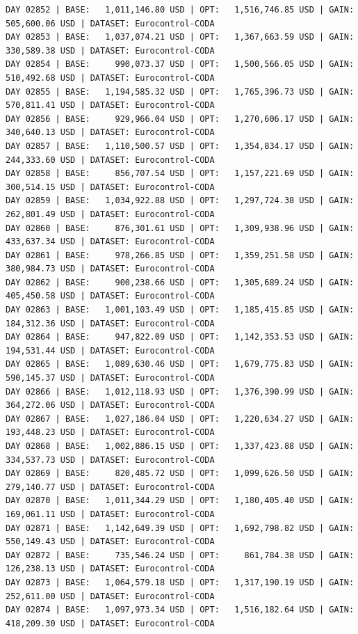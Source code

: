 \documentclass[11pt,a4paper]{article}
\begin{document}
\begin{verbatim}
DAY 02852 | BASE:   1,011,146.80 USD | OPT:   1,516,746.85 USD | GAIN: 505,600.06 USD | DATASET: Eurocontrol-CODA
DAY 02853 | BASE:   1,037,074.21 USD | OPT:   1,367,663.59 USD | GAIN: 330,589.38 USD | DATASET: Eurocontrol-CODA
DAY 02854 | BASE:     990,073.37 USD | OPT:   1,500,566.05 USD | GAIN: 510,492.68 USD | DATASET: Eurocontrol-CODA
DAY 02855 | BASE:   1,194,585.32 USD | OPT:   1,765,396.73 USD | GAIN: 570,811.41 USD | DATASET: Eurocontrol-CODA
DAY 02856 | BASE:     929,966.04 USD | OPT:   1,270,606.17 USD | GAIN: 340,640.13 USD | DATASET: Eurocontrol-CODA
DAY 02857 | BASE:   1,110,500.57 USD | OPT:   1,354,834.17 USD | GAIN: 244,333.60 USD | DATASET: Eurocontrol-CODA
DAY 02858 | BASE:     856,707.54 USD | OPT:   1,157,221.69 USD | GAIN: 300,514.15 USD | DATASET: Eurocontrol-CODA
DAY 02859 | BASE:   1,034,922.88 USD | OPT:   1,297,724.38 USD | GAIN: 262,801.49 USD | DATASET: Eurocontrol-CODA
DAY 02860 | BASE:     876,301.61 USD | OPT:   1,309,938.96 USD | GAIN: 433,637.34 USD | DATASET: Eurocontrol-CODA
DAY 02861 | BASE:     978,266.85 USD | OPT:   1,359,251.58 USD | GAIN: 380,984.73 USD | DATASET: Eurocontrol-CODA
DAY 02862 | BASE:     900,238.66 USD | OPT:   1,305,689.24 USD | GAIN: 405,450.58 USD | DATASET: Eurocontrol-CODA
DAY 02863 | BASE:   1,001,103.49 USD | OPT:   1,185,415.85 USD | GAIN: 184,312.36 USD | DATASET: Eurocontrol-CODA
DAY 02864 | BASE:     947,822.09 USD | OPT:   1,142,353.53 USD | GAIN: 194,531.44 USD | DATASET: Eurocontrol-CODA
DAY 02865 | BASE:   1,089,630.46 USD | OPT:   1,679,775.83 USD | GAIN: 590,145.37 USD | DATASET: Eurocontrol-CODA
DAY 02866 | BASE:   1,012,118.93 USD | OPT:   1,376,390.99 USD | GAIN: 364,272.06 USD | DATASET: Eurocontrol-CODA
DAY 02867 | BASE:   1,027,186.04 USD | OPT:   1,220,634.27 USD | GAIN: 193,448.23 USD | DATASET: Eurocontrol-CODA
DAY 02868 | BASE:   1,002,886.15 USD | OPT:   1,337,423.88 USD | GAIN: 334,537.73 USD | DATASET: Eurocontrol-CODA
DAY 02869 | BASE:     820,485.72 USD | OPT:   1,099,626.50 USD | GAIN: 279,140.77 USD | DATASET: Eurocontrol-CODA
DAY 02870 | BASE:   1,011,344.29 USD | OPT:   1,180,405.40 USD | GAIN: 169,061.11 USD | DATASET: Eurocontrol-CODA
DAY 02871 | BASE:   1,142,649.39 USD | OPT:   1,692,798.82 USD | GAIN: 550,149.43 USD | DATASET: Eurocontrol-CODA
DAY 02872 | BASE:     735,546.24 USD | OPT:     861,784.38 USD | GAIN: 126,238.13 USD | DATASET: Eurocontrol-CODA
DAY 02873 | BASE:   1,064,579.18 USD | OPT:   1,317,190.19 USD | GAIN: 252,611.00 USD | DATASET: Eurocontrol-CODA
DAY 02874 | BASE:   1,097,973.34 USD | OPT:   1,516,182.64 USD | GAIN: 418,209.30 USD | DATASET: Eurocontrol-CODA

\end{verbatim}
\end{document}
